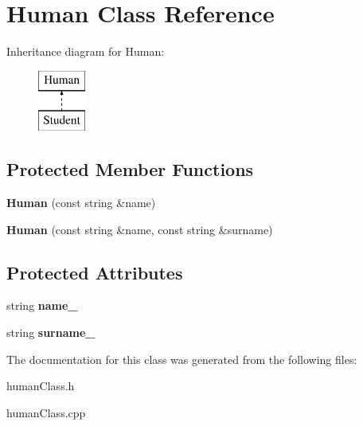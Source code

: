 \hypertarget{class_human}{}\section{Human Class Reference}
\label{class_human}
Inheritance diagram for Human\+:\begin{figure}[H]
\begin{center}
\leavevmode
\includegraphics[height=2.000000cm]{class_human}
\end{center}
\end{figure}
\subsection*{Protected Member Functions}
\begin{DoxyCompactItemize}
\item 
\mbox{\label{class_human_abfd57b90d90f9222384c76b44346ba7b}} 
{\bfseries Human} (const string \&name)
\item 
\mbox{\label{class_human_a87baec7c1de5375cb7e0f15050d855d3}} 
{\bfseries Human} (const string \&name, const string \&surname)
\end{DoxyCompactItemize}
\subsection*{Protected Attributes}
\begin{DoxyCompactItemize}
\item 
\mbox{\label{class_human_aae88b7b47fcb48ae282483b89b753927}} 
string {\bfseries name\+\_\+}
\item 
\mbox{\label{class_human_aa6632ccd30ebfa087e0d875b2d50340c}} 
string {\bfseries surname\+\_\+}
\end{DoxyCompactItemize}


The documentation for this class was generated from the following files\+:\begin{DoxyCompactItemize}
\item 
human\+Class.\+h\item 
human\+Class.\+cpp\end{DoxyCompactItemize}
